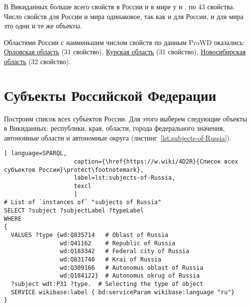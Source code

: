 В Викиданных больше всего свойств в России и в мире у  и , по 43 свойства\autocite{Russia_prowd}. Число свойств для России и мира одинаковое, так как и для России, и для мира это одни и те же объекты.

Областями России с наименьшим числом свойств по данным ProWD оказались: \href{http://www.wikidata.org/entity/Q3129}{Орловская область} (31 свойство), \href{http://www.wikidata.org/entity/Q3178}{Курская область} (31 свойство), \href{http://www.wikidata.org/entity/Q5851}{Новосибирская область} (32 свойство).

\section{Субъекты Российской Федерации}

Построим список всех субъектов России. Для этого выберем следующие объекты в Викиданных: республики, края, области, города федерального значения, автономные области и автономные округа (листинг~\protect\ref{lst:subjects-of-Russia}).


\begin{lstlisting}[ language=SPARQL, 
                    caption={\href{https://w.wiki/4D2R}{Список всех субъектов России}\protect\footnotemark},
                    label=lst:subjects-of-Russia,
                    texcl 
                    ]
# List of `instances of` "subjects of Russia" 
SELECT ?subject ?subjectLabel ?typeLabel
WHERE
{  
  VALUES ?type {wd:Q835714   # Oblast of Russia
                wd:Q41162    # Republic of Russia
                wd:Q183342   # Federal city of Russia
                wd:Q831740   # Krai of Russia
                wd:Q309166   # Autonomus oblast of Russia
                wd:Q184122}  # Autonomus okrug of Russia
  ?subject wdt:P31 ?type.  # Selecting the type of object
  SERVICE wikibase:label { bd:serviceParam wikibase:language "ru"}
}
\end{lstlisting}%

